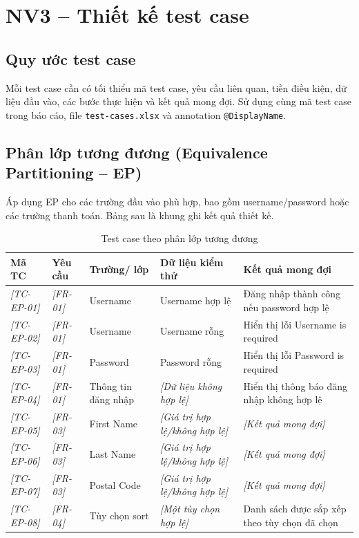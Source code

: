 \documentclass[a4paper,12pt]{article}
\newcommand{\fillin}[1]{\textit{[#1]}}
\begin{document}
\section{NV3 -- Thiết kế test case}

\subsection{Quy ước test case}
Mỗi test case cần có tối thiểu mã test case, yêu cầu liên quan, tiền điều kiện, dữ liệu đầu vào, các bước thực hiện và kết quả mong đợi. Sử dụng cùng mã test case trong báo cáo, file \texttt{test-cases.xlsx} và annotation \texttt{@DisplayName}.

\subsection{Phân lớp tương đương (Equivalence Partitioning -- EP)}
Áp dụng EP cho các trường đầu vào phù hợp, bao gồm username/password hoặc các trường thanh toán. Bảng sau là khung ghi kết quả thiết kế.
\begin{table}[htbp]
\centering
\caption{Test case theo phân lớp tương đương}
\small
\begin{tabularx}{\textwidth}{|p{1.8cm}|p{2cm}|p{2.4cm}|X|X|}
\hline
\textbf{Mã TC} & \textbf{Yêu cầu} & \textbf{Trường/ lớp} & \textbf{Dữ liệu kiểm thử} & \textbf{Kết quả mong đợi} \\
\hline
\fillin{TC-EP-01} & \fillin{FR-01} & Username & Username hợp lệ & Đăng nhập thành công nếu password hợp lệ \\
\hline
\fillin{TC-EP-02} & \fillin{FR-01} & Username & Username rỗng & Hiển thị lỗi Username is required \\
\hline
\fillin{TC-EP-03} & \fillin{FR-01} & Password & Password rỗng & Hiển thị lỗi Password is required \\
\hline
\fillin{TC-EP-04} & \fillin{FR-01} & Thông tin đăng nhập & \fillin{Dữ liệu không hợp lệ} & Hiển thị thông báo đăng nhập không hợp lệ \\
\hline
\fillin{TC-EP-05} & \fillin{FR-03} & First Name & \fillin{Giá trị hợp lệ/không hợp lệ} & \fillin{Kết quả mong đợi} \\
\hline
\fillin{TC-EP-06} & \fillin{FR-03} & Last Name & \fillin{Giá trị hợp lệ/không hợp lệ} & \fillin{Kết quả mong đợi} \\
\hline
\fillin{TC-EP-07} & \fillin{FR-03} & Postal Code & \fillin{Giá trị hợp lệ/không hợp lệ} & \fillin{Kết quả mong đợi} \\
\hline
\fillin{TC-EP-08} & \fillin{FR-04} & Tùy chọn sort & \fillin{Một tùy chọn hợp lệ} & Danh sách được sắp xếp theo tùy chọn đã chọn \\
\hline
\end{tabularx}
\end{table}
\end{document}
